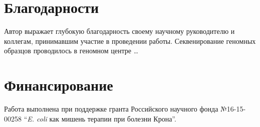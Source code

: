 \chapter{Благодарности}
Автор выражает глубокую благодарность своему научному руководителю и коллегам, принимавшим участие в проведении работы. Секвенирование геномных образцов проводилось в геномном центре \dots


\chapter{Финансирование}
Работа выполнена при поддержке гранта Российского научного фонда №16-15-00258 ``\textit{E. coli} как мишень терапии при болезни Крона''.

